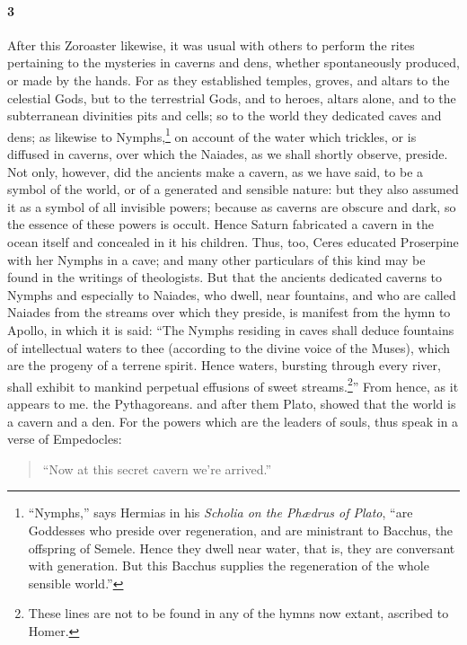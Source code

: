 \documentclass[a4paper,12pt]{article}
\begin{document}
\paragraph{3} After this Zoroaster likewise, it was usual with others to
perform the rites pertaining to the mysteries in caverns and dens, whether
spontaneously produced, or made by the hands. For as they established temples,
groves, and altars to the celestial Gods, but to the terrestrial Gods, and to
heroes, altars alone, and to the subterranean divinities pits and cells; so to
the world they dedicated caves and dens; as likewise to
Nymphs,\footnote{\-``Nymphs,'' says Hermias in his \textit{Scholia on the
Ph{\ae}drus of Plato}, ``are Goddesses who preside over regeneration, and are
ministrant to Bacchus, the offspring of Semele. Hence they dwell near water,
that is, they are conversant with generation. But this Bacchus supplies the
regeneration of the whole sensible world.''} on account of the water which
trickles, or is diffused in caverns, over which the Naiades, as we shall
shortly observe, preside. Not only, however, did the ancients make a cavern, as
we have said, to be a symbol of the world, or of a generated and sensible
nature: but they also assumed it as a symbol of all invisible powers; because
as caverns are obscure and dark, so the essence of these powers is occult.
Hence Saturn fabricated a cavern in the ocean itself and concealed in it his
children. Thus, too, Ceres educated Proserpine with her Nymphs in a cave; and
many other particulars of this kind may be found in the writings of
theologists. But that the ancients dedicated caverns to Nymphs and especially
to Naiades, who dwell, near fountains, and who are called Naiades from the
streams over which they preside, is manifest from the hymn to Apollo, in which
it is said: ``The Nymphs residing in caves shall deduce fountains of
intellectual waters to thee (according to the divine voice of the Muses), which
are the progeny of a terrene spirit. Hence waters, bursting through every
river, shall exhibit to mankind perpetual effusions of sweet
streams.\footnote{These lines are not to be found in any of the hymns now
extant, ascribed to Homer.}'' From hence, as it appears to me. the
Pythagoreans. and after them Plato, showed that the world is a cavern and a
den. For the powers which are the leaders of souls, thus speak in a verse of
Empedocles:

\begin{verse}
``Now at this secret cavern we're arrived.''
\end{verse}
\end{document}
